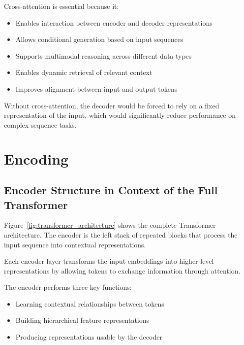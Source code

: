 \documentclass[11pt]{article}
\begin{document}
Cross-attention is essential because it:

\begin{itemize}

\item Enables interaction between encoder and decoder representations
\item Allows conditional generation based on input sequences
\item Supports multimodal reasoning across different data types
\item Enables dynamic retrieval of relevant context
\item Improves alignment between input and output tokens

\end{itemize}

Without cross-attention, the decoder would be forced to rely on a fixed representation of the input, which would significantly reduce performance on complex sequence tasks.

\section{Encoding}

\subsection{Encoder Structure in Context of the Full Transformer}

Figure~\ref{fig:transformer_architecture} shows the complete Transformer architecture. The encoder is the left stack of repeated blocks that process the input sequence into contextual representations.

Each encoder layer transforms the input embeddings into higher-level representations by allowing tokens to exchange information through attention.

The encoder performs three key functions:

\begin{itemize}

\item Learning contextual relationships between tokens
\item Building hierarchical feature representations
\item Producing representations usable by the decoder

\end{itemize}
\end{document}
